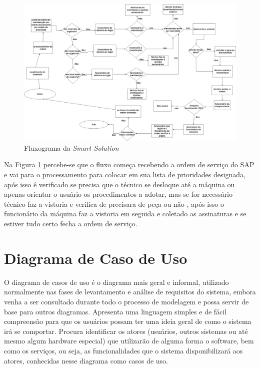\begin{figure}[H]
	\caption{\label{fluxograma2teste}Fluxograma da\textit{ Smart Solution}}%
	\begin{center}
		\includegraphics[scale=0.40,angle=90]{Figuras/fluxograma2teste}
		
	\end{center}
\end{figure}
\newpage


Na Figura \ref{fluxograma2teste} percebe-se que o fluxo começa recebendo a ordem de serviço do SAP e vai para o processamento para colocar em sua lista de prioridades designada, após isso é verificado se precisa que o técnico se desloque até a máquina ou apenas orientar o usuário os procedimentos a adotar, mas se for necessário técnico faz a vistoria e verifica de precisara de peça ou não , após isso o funcionário da máquina faz a vistoria  em seguida e coletado as assinaturas e se estiver tudo certo fecha a ordem de serviço.

\newpage

\section{Diagrama de Caso de Uso}

O diagrama de casos de uso é o diagrama mais geral e informal, utilizado normalmente nas fases de levantamento e análise de requisitos do sistema, embora venha a ser consultado durante todo o processo de modelagem e possa servir de base para outros diagramas. Apresenta uma linguagem simples e de fácil compreensão para que os usuários possam ter uma ideia geral de como o sistema irá se comportar. Procura identificar os atores (usuários, outros sistemas ou até mesmo algum hardware especial) que utilizarão de alguma forma  o software, bem como os serviços, ou seja, as funcionalidades que o sistema disponibilizará aos atores, conhecidas nesse diagrama como casos de uso.\cite{guedes2009uml}

